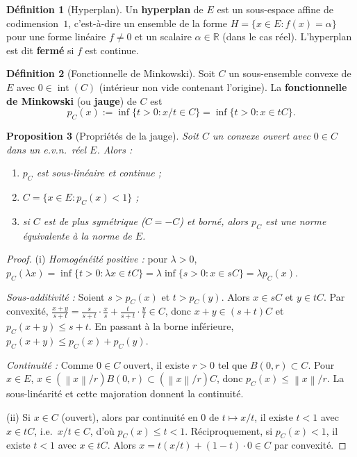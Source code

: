 \documentclass[a4paper,12pt]{book}
\newcommand{\R}{\mathbb{R}}
\newcommand{\norm}[1]{\left\| #1 \right\|}
\theoremstyle{definition}
\newtheorem{definition}{Définition}[chapter]
\theoremstyle{plain}
\newtheorem{proposition}[definition]{Proposition}
\theoremstyle{remark}
\begin{document}
\begin{definition}[Hyperplan]\label{def:hyperplan}
Un \textbf{hyperplan} de $E$ est un sous-espace affine de codimension~$1$, c'est-à-dire
un ensemble de la forme $H = \{x \in E : f(x) = \alpha\}$ pour une forme linéaire
$f \neq 0$ et un scalaire $\alpha \in \R$ (dans le cas réel). L'hyperplan est dit
\textbf{fermé} si $f$ est continue.
\end{definition}

\begin{definition}[Fonctionnelle de Minkowski]\label{def:jauge-minkowski}
Soit $C$ un sous-ensemble convexe de $E$ avec $0 \in
\operatorname{int}(C)$ (intérieur non vide contenant l'origine). La \textbf{fonctionnelle
de Minkowski} (ou \textbf{jauge}) de $C$ est
\[
    p_C(x) := \inf\{t > 0 : x/t \in C\} = \inf\{t > 0 : x \in tC\}.
\]
\end{definition}

\begin{proposition}[Propriétés de la jauge]\label{prop:proprietes-jauge}
Soit $C$ un convexe ouvert avec $0 \in C$ dans un e.v.n.\
réel $E$. Alors :
\begin{enumerate}[label=(\roman*)]
    \item $p_C$ est sous-linéaire et continue ;
    \item $C = \{x \in E : p_C(x) < 1\}$ ;
    \item si $C$ est de plus symétrique ($C = -C$) et borné, alors $p_C$ est une norme
          équivalente à la norme de $E$.
\end{enumerate}
\end{proposition}

\begin{proof}
(i) \emph{Homogénéité positive :} pour $\lambda > 0$,
$p_C(\lambda x) = \inf\{t > 0 : \lambda x \in tC\} = \lambda \inf\{s > 0 : x \in sC\}
= \lambda p_C(x)$.

\emph{Sous-additivité :} Soient $s > p_C(x)$ et $t > p_C(y)$. Alors $x \in sC$ et
$y \in tC$. Par convexité,
$\frac{x+y}{s+t} = \frac{s}{s+t}\cdot\frac{x}{s} + \frac{t}{s+t}\cdot\frac{y}{t} \in C$,
donc $x + y \in (s+t)C$ et $p_C(x+y) \leq s+t$. En passant à la borne inférieure,
$p_C(x+y) \leq p_C(x) + p_C(y)$.

\emph{Continuité :} Comme $0 \in C$ ouvert, il existe $r > 0$ tel que $B(0,r) \subset C$.
Pour $x \in E$, $x \in (\norm{x}/r)B(0,r) \subset (\norm{x}/r)C$, donc
$p_C(x) \leq \norm{x}/r$. La sous-linéarité et cette majoration donnent la continuité.

(ii) Si $x \in C$ (ouvert), alors par continuité en $0$ de $t \mapsto x/t$, il existe
$t < 1$ avec $x \in tC$, i.e.\ $x/t \in C$, d'où $p_C(x) \leq t < 1$.
Réciproquement, si $p_C(x) < 1$, il existe $t < 1$ avec $x \in tC$.
Alors $x = t(x/t) + (1-t)\cdot 0 \in C$ par convexité.
\end{proof}
\end{document}
